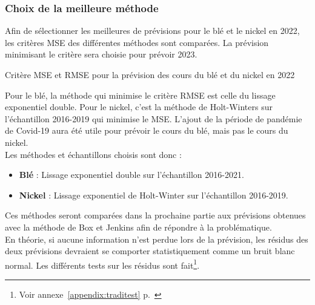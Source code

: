 \subsubsection{Choix de la meilleure méthode}\label{sec:mse}
Afin de sélectionner les meilleures de prévisions pour le blé et le nickel en 2022, les critères MSE des différentes méthodes sont comparées. La prévision minimisant le 
critère sera choisie pour prévoir 2023.
\begin{table}[H]
     \centering
     \caption{Critère MSE et RMSE pour la prévision des cours du blé et du nickel en 2022}
     \sffamily
     
\end{table}
Pour le blé, la méthode qui minimise le critère RMSE est celle du lissage exponentiel double. Pour le nickel, c'est la méthode de Holt-Winters sur l'échantillon
2016-2019 qui minimise le MSE. L'ajout de la période de pandémie de Covid-19 aura été utile pour prévoir le cours du blé, mais pas le cours du nickel.\\[11pt]
Les méthodes et échantillons choisis sont donc :
\begin{itemize}
    \item\textbf{Blé}  : Lissage exponentiel double sur l'échantillon 2016-2021.
    \item\textbf{Nickel}  : Lissage exponentiel de Holt-Winter sur l'échantillon 2016-2019.
\end{itemize}
Ces méthodes seront comparées dans la prochaine partie aux prévisions obtenues avec la méthode de Box et Jenkins afin de répondre à la problématique.\\
[11pt]
En théorie, si aucune information n'est perdue lors de la prévision, les résidus des deux prévisions devraient se comporter statistiquement comme un bruit blanc normal. 
Les différents tests sur les résidus sont fait\footnote{Voir annexe~\ref{appendix:traditest} p.~\pageref{appendix:traditest}}.
